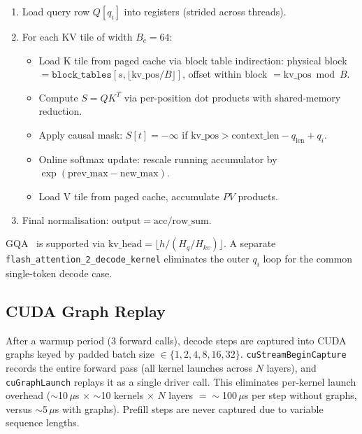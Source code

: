 \documentclass[11pt,a4paper]{article}
\begin{document}
\begin{enumerate}
  \item Load query row $Q[q_i]$ into registers (strided across threads).
  \item For each KV tile of width $B_c = 64$:
        \begin{itemize}
          \item Load K tile from paged cache via block table indirection:
                physical block $= \texttt{block\_tables}[s, \lfloor\text{kv\_pos} / B\rfloor]$,
                offset within block $= \text{kv\_pos} \bmod B$.
          \item Compute $S = QK^T$ via per-position dot products with
                shared-memory reduction.
          \item Apply causal mask: $S[t] = -\infty$ if $\text{kv\_pos} > \text{context\_len} - q_{\text{len}} + q_i$.
          \item Online softmax update: rescale running accumulator by
                $\exp(\text{prev\_max} - \text{new\_max})$.
          \item Load V tile from paged cache, accumulate $PV$ products.
        \end{itemize}
  \item Final normalisation: $\text{output} = \text{acc} / \text{row\_sum}$.
\end{enumerate}

GQA~\cite{ainslie2023gqa} is supported via
$\text{kv\_head} = \lfloor h / (H_q / H_{kv}) \rfloor$.
A separate \texttt{flash\_attention\_2\_decode\_kernel} eliminates the outer
$q_i$ loop for the common single-token decode case.

\subsection{CUDA Graph Replay}

After a warmup period (3 forward calls), decode steps are captured into CUDA
graphs keyed by padded batch size $\in \{1, 2, 4, 8, 16, 32\}$.
\texttt{cuStreamBeginCapture} records the entire forward pass (all kernel launches
across $N$ layers), and \texttt{cuGraphLaunch} replays it as a single driver call.
This eliminates per-kernel launch overhead ($\sim$10\,$\mu$s $\times$ $\sim$10
kernels $\times$ $N$ layers $= \sim$100\,$\mu$s per step without graphs, versus
$\sim$5\,$\mu$s with graphs). Prefill steps are never captured due to variable
sequence lengths.

\end{document}
